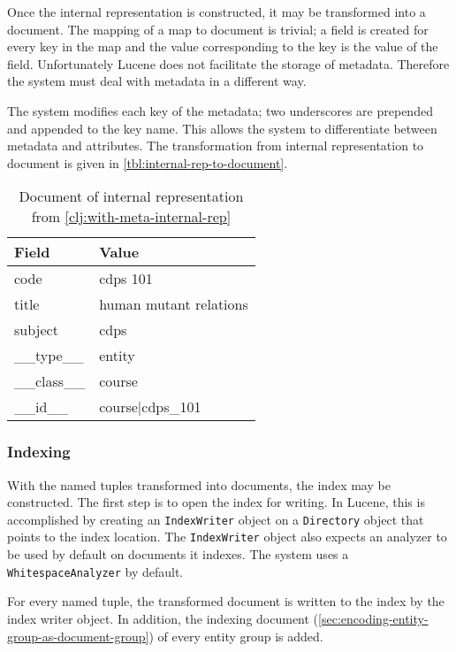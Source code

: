 			Once the internal representation is constructed, it may be transformed into a document.  The mapping of a map to document is trivial; a field is created for every key in the map and the value corresponding to the key is the value of the field.  Unfortunately Lucene does not facilitate the storage of metadata.  Therefore the system must deal with metadata in a different way.
			
			The system modifies each key of the metadata; two underscores are prepended and appended to the key name.  This allows the system to differentiate between metadata and attributes.  The transformation from internal representation to document is given in \vref{tbl:internal-rep-to-document}.
			
			\begin{table}[H]
				\centering
				
				\begin{tabular}{ll}
					\toprule
					Field & Value \\
					\midrule
					code & cdps 101 \\
					title & human mutant relations \\
					subject & cdps \\
					\_\_type\_\_ & entity \\
					\_\_class\_\_ & course \\
					\_\_id\_\_ & course|cdps\_101 \\
					\bottomrule
				\end{tabular}
				
				\caption{Document of internal representation from \vref{clj:with-meta-internal-rep}}
				\label{tbl:internal-rep-to-document}
			\end{table}
		
		\subsubsection{Indexing}
			With the named tuples transformed into documents, the index may be constructed.  The first step is to open the index for writing.  In Lucene, this is accomplished by creating an \texttt{IndexWriter} object on a \texttt{Directory} object that points to the index location.  The \texttt{IndexWriter} object also expects an analyzer to be used by default on documents it indexes.  The system uses a \texttt{WhitespaceAnalyzer} by default.
			
			For every named tuple, the transformed document is written to the index by the index writer object.  In addition, the indexing document (\cref{sec:encoding-entity-group-as-document-group}) of every entity group is added.
		
